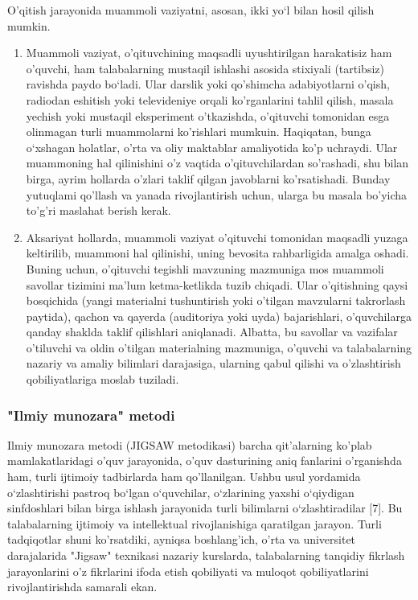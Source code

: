 \documentclass[epsf]{article}
\begin{document}
O'qitish jarayonida muammoli vaziyatni, asosan, ikki yo`l bilan hosil
qilish mumkin.
\begin{enumerate}
	\item 
	Muammoli vaziyat, o'qituvchining maqsadli uyushtirilgan harakatisiz
	ham o'quvchi, ham talabalarning mustaqil ishlashi asosida stixiyali (tartibsiz)
	ravishda paydo bo`ladi. Ular darslik yoki qo'shimcha adabiyotlarni o'qish,
	radiodan eshitish yoki televideniye orqali ko'rganlarini tahlil qilish, masala
	yechish yoki mustaqil eksperiment o'tkazishda, o'qituvchi tomonidan esga
	olinmagan turli muammolarni ko'rishlari mumkuin. Haqiqatan, bunga o‘xshagan holatlar, o'rta va oliy maktablar amaliyotida ko'p uchraydi. Ular
	muammoning hal qilinishini o'z vaqtida o'qituvchilardan so'rashadi, shu
	bilan birga, ayrim hollarda o'zlari taklif qilgan javoblarni ko'rsatishadi.
	Bunday yutuqlami qo'llash va yanada rivojlantirish uchun, ularga bu masala
	bo'yicha to'g'ri maslahat berish kerak.
	
	\item Aksariyat hollarda, muammoli vaziyat o'qituvchi tomonidan maqsadli
	yuzaga keltirilib, muammoni hal qilinishi, uning bevosita rahbarligida
	amalga oshadi. Buning uchun, o'qituvchi tegishli mavzuning mazmuniga
	mos muammoli savollar tizimini ma'lum ketma-ketlikda tuzib chiqadi. Ular
	o'qitishning qaysi bosqichida (yangi materialni tushuntirish yoki o'tilgan
	mavzularni takrorlash paytida), qachon va qayerda (auditoriya yoki uyda)
	bajarishlari, o'quvchilarga qanday shaklda taklif qilishlari aniqlanadi. Albatta,
	bu savollar va vazifalar o'tiluvchi va oldin o'tilgan materialning mazmuniga,
	o'quvchi va talabalarning nazariy va amaliy bilimlari darajasiga, ularning
	qabul qilishi va o'zlashtirish qobiliyatlariga moslab tuziladi.
	
\end{enumerate}
\subsubsection{"Ilmiy munozara" metodi}
\hspace{0.4cm}
Ilmiy munozara metodi (JIGSAW metodikasi) barcha qit'alarning ko'plab mamlakatlaridagi o'quv jarayonida, o'quv dasturining aniq fanlarini o'rganishda ham, turli ijtimoiy tadbirlarda ham qo'llanilgan. Ushbu usul yordamida o`zlashtirishi pastroq bo`lgan o`quvchilar, o`zlarining yaxshi o`qiydigan sinfdoshlari bilan birga ishlash jarayonida turli bilimlarni o`zlashtiradilar [7]. 
Bu talabalarning ijtimoiy va intellektual rivojlanishiga qaratilgan jarayon. Turli tadqiqotlar shuni ko'rsatdiki, ayniqsa boshlang'ich, o'rta va universitet darajalarida "Jigsaw" texnikasi nazariy kurslarda, talabalarning tanqidiy fikrlash jarayonlarini o'z fikrlarini ifoda etish qobiliyati va muloqot qobiliyatlarini rivojlantirishda samarali ekan. 
\end{document}
